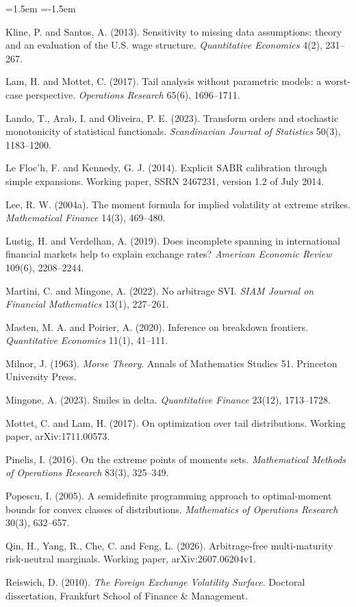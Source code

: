 \documentclass[11pt]{article}
\theoremstyle{remark}
\begin{document}
\begin{list}{}{\leftmargin=1.5em \itemindent=-1.5em \itemsep=2pt \parsep=0pt}
\item Kline, P. and Santos, A. (2013). Sensitivity to missing data assumptions: theory and an evaluation of the U.S. wage structure. \emph{Quantitative Economics} 4(2), 231--267.
\item Lam, H. and Mottet, C. (2017). Tail analysis without parametric models: a worst-case perspective. \emph{Operations Research} 65(6), 1696--1711.
\item Lando, T., Arab, I. and Oliveira, P. E. (2023). Transform orders and stochastic monotonicity of statistical functionals. \emph{Scandinavian Journal of Statistics} 50(3), 1183--1200.
\item Le Floc'h, F. and Kennedy, G. J. (2014). Explicit SABR calibration through simple expansions. Working paper, SSRN 2467231, version 1.2 of July 2014.
\item Lee, R. W. (2004a). The moment formula for implied volatility at extreme strikes. \emph{Mathematical Finance} 14(3), 469--480.
\item Lustig, H. and Verdelhan, A. (2019). Does incomplete spanning in international financial markets help to explain exchange rates? \emph{American Economic Review} 109(6), 2208--2244.
\item Martini, C. and Mingone, A. (2022). No arbitrage SVI. \emph{SIAM Journal on Financial Mathematics} 13(1), 227--261.
\item Masten, M. A. and Poirier, A. (2020). Inference on breakdown frontiers. \emph{Quantitative Economics} 11(1), 41--111.
\item Milnor, J. (1963). \emph{Morse Theory}. Annals of Mathematics Studies 51. Princeton University Press.
\item Mingone, A. (2023). Smiles in delta. \emph{Quantitative Finance} 23(12), 1713--1728.
\item Mottet, C. and Lam, H. (2017). On optimization over tail distributions. Working paper, arXiv:1711.00573.
\item Pinelis, I. (2016). On the extreme points of moments sets. \emph{Mathematical Methods of Operations Research} 83(3), 325--349.
\item Popescu, I. (2005). A semidefinite programming approach to optimal-moment bounds for convex classes of distributions. \emph{Mathematics of Operations Research} 30(3), 632--657.
\item Qin, H., Yang, R., Che, C. and Feng, L. (2026). Arbitrage-free multi-maturity risk-neutral marginals. Working paper, arXiv:2607.06204v1.
\item Reiswich, D. (2010). \emph{The Foreign Exchange Volatility Surface}. Doctoral dissertation, Frankfurt School of Finance \& Management.

\end{list}
\end{document}
